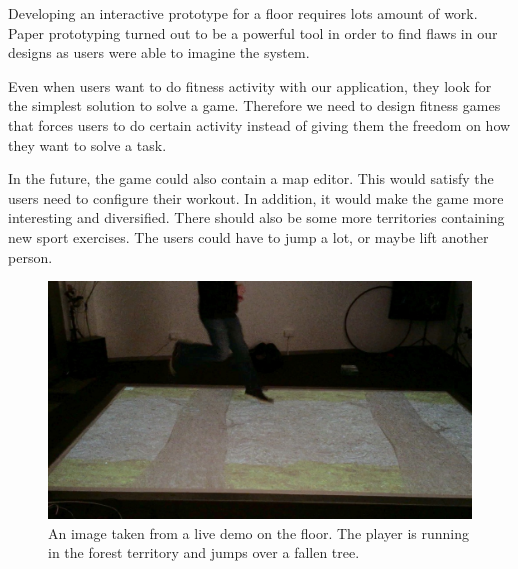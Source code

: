 \documentclass{sigchi}
\begin{document}
  Developing an interactive prototype for a floor requires lots amount of work. Paper prototyping turned out to be a powerful tool in order to find flaws in our designs as users were able to imagine the system.

  Even when users want to do fitness activity with our application, they look for the simplest solution to solve a game. Therefore we need to design fitness games that forces users to do certain activity instead of giving them the freedom on how they want to solve a task.

  In the future, the game could also contain a map editor. This would satisfy the users need to configure their workout. In addition, it would make the game more interesting and diversified. There should also be some more territories containing new sport exercises. The users could have to jump a lot, or maybe lift another person.

  \newpage

  \begin{figure}[htb]
    \centering
    \includegraphics[width=\linewidth]{Image_22}
    \caption{An image taken from a live demo on the floor. The player is running in the forest territory and jumps over a fallen tree.}
    \label{fig:copy}
  \end{figure}
\end{document}
